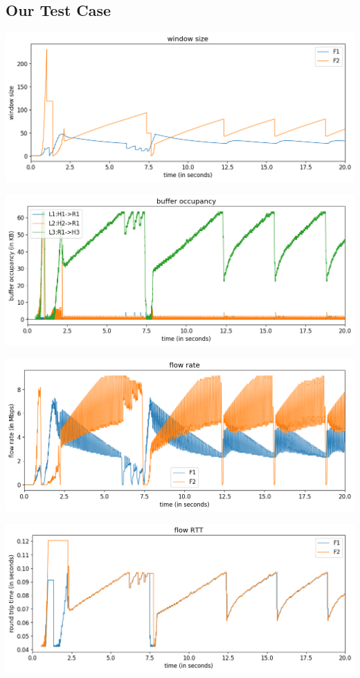 \documentclass{article}
\begin{document}
\subsection{Our Test Case}

\includegraphics[width = \textwidth]{"test_case_custom window size"}

\includegraphics[width = \textwidth]{"test_case_custom buffer occupancy"}

\includegraphics[width = \textwidth]{"test_case_custom flow rate"}

\includegraphics[width = \textwidth]{"test_case_custom flow RTT"}
\end{document}
